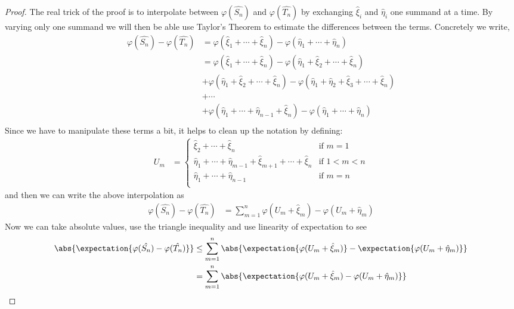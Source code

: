 \begin{proof}
The real trick of the proof is to interpolate between
$\varphi(\hat{S_n})$ and $\varphi(\hat{T_n})$ by exchanging
$\hat{\xi}_i$ and $\hat{\eta}_i$ one summand at a time.  By varying
only one summand we will then be able use Taylor's Theorem to
estimate the differences between the terms.  Concretely we write,
\begin{align*}
\varphi(\hat{S_n}) - \varphi(\hat{T_n}) &= \varphi(\hat{\xi}_1 + \cdots + \hat{\xi}_n) -
\varphi(\hat{\eta}_1 + \cdots + \hat{\eta}_n) \\
&= \varphi(\hat{\xi}_1 + \cdots + \hat{\xi}_n) - \varphi(\hat{\eta}_1 +
\hat{\xi}_2 + 
\cdots + \hat{\xi}_n) \\
&+ \varphi(\hat{\eta}_1 +
\hat{\xi}_2 +
\cdots + \hat{\xi}_n) - 
\varphi(\hat{\eta}_1 + \hat{\eta}_2 + \hat{\xi}_3 + \cdots + \hat{\xi}_n) \\
&+ \cdots\\
&+ \varphi(\hat{\eta}_1 +
\cdots  +
\hat{\eta}_{n-1} + \hat{\xi}_n) - 
\varphi(\hat{\eta}_1 + \cdots + \hat{\eta}_n) \\
\end{align*}
Since we have to manipulate these terms a bit, it helps to clean up
the notation by defining:
\begin{align*}
U_m &= \begin{cases}
\hat{\xi}_2 + \cdots + \hat{\xi}_n & \text{if $m=1$} \\
\hat{\eta}_1 + \cdots + \hat{\eta}_{m-1}+\hat{\xi}_{m+1} + \cdots +
\hat{\xi}_n & \text{if $1 < m<n$} \\
\hat{\eta}_1 + \cdots + \hat{\eta}_{n-1} & \text{if $m=n$} \\
\end{cases}
\end{align*}
and then we can write the above interpolation as 
\begin{align*}
\varphi(\hat{S_n}) - \varphi(\hat{T_n}) &= \sum_{m=1}^n \varphi(U_m + \hat{\xi}_m) -\varphi(U_m + \hat{\eta}_m)
\end{align*}
Now we can take absolute values, use the triangle inequality and use
linearity of expectation to see
\begin{align*}
\abs{\expectation{\varphi(\hat{S_n}) - \varphi(\hat{T_n})}} &\leq
\sum_{m=1}^n \abs{\expectation{\varphi(U_m + \hat{\xi}_m)}
  -\expectation{\varphi(U_m + \hat{\eta}_m)}}\\
&=\sum_{m=1}^n \abs{\expectation{\varphi(U_m + \hat{\xi}_m)
  -\varphi(U_m + \hat{\eta}_m)}}
\end{align*}


\end{proof}
